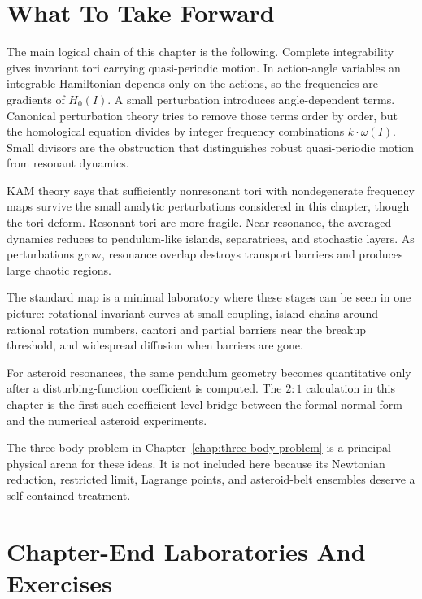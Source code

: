 \section{What To Take Forward}
\label{sec:perturbation-chaos-take-forward}

The main logical chain of this chapter is the following. Complete
integrability gives invariant tori carrying quasi-periodic motion. In
action-angle variables an integrable Hamiltonian depends only on the actions,
so the frequencies are gradients of \(H_0(I)\). A small perturbation introduces
angle-dependent terms. Canonical perturbation theory tries to remove those
terms order by order, but the homological equation divides by integer
frequency combinations \(k\cdot\omega(I)\). Small divisors are the obstruction
that distinguishes robust quasi-periodic motion from resonant dynamics.

KAM theory says that sufficiently nonresonant tori with nondegenerate frequency
maps survive the small analytic perturbations considered in this chapter,
though the tori deform. Resonant tori are more fragile. Near resonance, the
averaged dynamics reduces to pendulum-like islands, separatrices, and
stochastic layers. As perturbations grow, resonance overlap destroys transport
barriers and produces large chaotic regions.

The standard map is a minimal laboratory where these stages can be seen in one
picture: rotational invariant curves at small coupling, island chains around
rational rotation numbers, cantori and partial barriers near the breakup
threshold, and widespread diffusion when barriers are gone.

For asteroid resonances, the same pendulum geometry becomes quantitative only
after a disturbing-function coefficient is computed. The \(2:1\) calculation
in this chapter is the first such coefficient-level bridge between the formal
normal form and the numerical asteroid experiments.

The three-body problem in Chapter~\ref{chap:three-body-problem} is a principal
physical arena for these ideas. It is not included here because its Newtonian
reduction, restricted limit, Lagrange points, and asteroid-belt ensembles
deserve a self-contained treatment.

\section{Chapter-End Laboratories And Exercises}
\label{sec:perturbation-chaos-chapter-end-labs}


